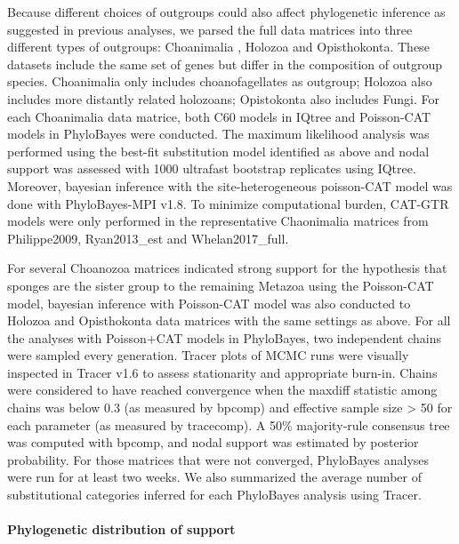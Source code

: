 \documentclass[]{article}
\let\oldparagraph\paragraph
\renewcommand{\paragraph}[1]{\oldparagraph{#1}\mbox{}}
\begin{document}
Because different choices of outgroups could also affect phylogenetic
inference as suggested in previous analyses, we parsed the full data
matrices into three different types of outgroups: Choanimalia , Holozoa
and Opisthokonta. These datasets include the same set of genes but
differ in the composition of outgroup species. Choanimalia only includes
choanofagellates as outgroup; Holozoa also includes more distantly
related holozoans; Opistokonta also includes Fungi. For each Choanimalia
data matrice, both C60 models in IQtree and Poisson-CAT models in
PhyloBayes were conducted. The maximum likelihood analysis was performed
using the best-fit substitution model identified as above and nodal
support was assessed with 1000 ultrafast bootstrap replicates using
IQtree. Moreover, bayesian inference with the site-heterogeneous
poisson-CAT model was done with PhyloBayes-MPI v1.8. To minimize
computational burden, CAT-GTR models were only performed in the
representative Chaonimalia matrices from Philippe2009, Ryan2013\_est and
Whelan2017\_full.

For several Choanozoa matrices indicated strong support for the
hypothesis that sponges are the sister group to the remaining Metazoa
using the Poisson-CAT model, bayesian inference with Poisson-CAT model
was also conducted to Holozoa and Opisthokonta data matrices with the
same settings as above. For all the analyses with Poisson+CAT models in
PhyloBayes, two independent chains were sampled every generation. Tracer
plots of MCMC runs were visually inspected in Tracer v1.6 to assess
stationarity and appropriate burn-in. Chains were considered to have
reached convergence when the maxdiff statistic among chains was below
0.3 (as measured by bpcomp) and effective sample size \textgreater{} 50
for each parameter (as measured by tracecomp). A 50\% majority‐rule
consensus tree was computed with bpcomp, and nodal support was estimated
by posterior probability. For those matrices that were not converged,
PhyloBayes analyses were run for at least two weeks. We also summarized
the average number of substitutional categories inferred for each
PhyloBayes analysis using Tracer.

\hypertarget{phylogenetic-distribution-of-support}{%
\paragraph{Phylogenetic distribution of
support}\label{phylogenetic-distribution-of-support}}
\end{document}
